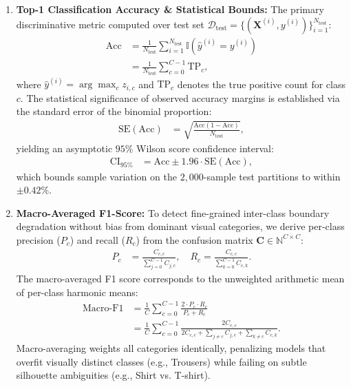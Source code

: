 \documentclass[journal]{IEEEtran}
\begin{document}
\begin{enumerate}
    \item \textbf{Top-1 Classification Accuracy \& Statistical Bounds:} The primary discriminative metric computed over test set $\mathcal{D}_{\mathrm{test}} = \{(\mathbf{X}^{(i)}, y^{(i)})\}_{i=1}^{N_{\mathrm{test}}}$:
    \begin{align}
    \mathrm{Acc} &= \frac{1}{N_{\mathrm{test}}} \sum_{i=1}^{N_{\mathrm{test}}} \mathbb{I}\left( \hat{y}^{(i)} = y^{(i)} \right) \nonumber \\
    &= \frac{1}{N_{\mathrm{test}}} \sum_{c=0}^{C-1} \mathrm{TP}_c,
    \label{eq:accuracy_metric}
    \end{align}
    where $\hat{y}^{(i)} = \arg\max_c z_{i,c}$ and $\mathrm{TP}_c$ denotes the true positive count for class $c$. The statistical significance of observed accuracy margins is established via the standard error of the binomial proportion:
    \begin{align}
    \mathrm{SE}(\mathrm{Acc}) &= \sqrt{\frac{\mathrm{Acc}(1 - \mathrm{Acc})}{N_{\mathrm{test}}}},
    \label{eq:accuracy_se}
    \end{align}
    yielding an asymptotic $95\%$ Wilson score confidence interval:
    \begin{align}
    \mathrm{CI}_{95\%} &= \mathrm{Acc} \pm 1.96 \cdot \mathrm{SE}(\mathrm{Acc}),
    \label{eq:accuracy_ci}
    \end{align}
    which bounds sample variation on the $2{,}000$-sample test partitions to within $\pm 0.42\%$.

    \item \textbf{Macro-Averaged F1-Score:} To detect fine-grained inter-class boundary degradation without bias from dominant visual categories, we derive per-class precision ($P_c$) and recall ($R_c$) from the confusion matrix $\mathbf{C} \in \mathbb{N}^{C \times C}$:
    \begin{align}
    P_c &= \frac{C_{c,c}}{\sum_{j=0}^{C-1} C_{j,c}}, \quad R_c = \frac{C_{c,c}}{\sum_{k=0}^{C-1} C_{c,k}}.
    \label{eq:precision_recall_defs}
    \end{align}
    The macro-averaged F1 score corresponds to the unweighted arithmetic mean of per-class harmonic means:
    \begin{align}
    \mathrm{Macro\text{-}F1} &= \frac{1}{C} \sum_{c=0}^{C-1} \frac{2 \cdot P_c \cdot R_c}{P_c + R_c} \nonumber \\
    &= \frac{1}{C} \sum_{c=0}^{C-1} \frac{2 C_{c,c}}{2 C_{c,c} + \sum_{j \ne c} C_{j,c} + \sum_{k \ne c} C_{c,k}}.
    \label{eq:macro_f1}
    \end{align}
    Macro-averaging weights all categories identically, penalizing models that overfit visually distinct classes (e.g., Trousers) while failing on subtle silhouette ambiguities (e.g., Shirt vs. T-shirt).


\end{enumerate}
\end{document}
